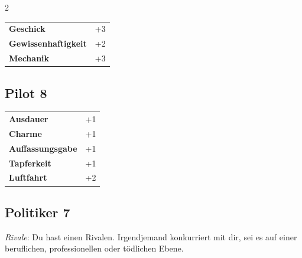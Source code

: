\begin{multicols}{2}
\begin{tcolorbox}
\begin{tabular}{@{}ll@{}}
    \textbf{Geschick} & +3\\
    \textbf{Gewissenhaftigkeit} & +2\\
    \textbf{Mechanik} & +3\\
\end{tabular}


\end{tcolorbox}

\begin{tcolorbox}
    \subsection*{Pilot \hfill \small{8 }}
    \tcblower




\begin{tabular}{@{}ll@{}}
    \textbf{Ausdauer} & +1\\
    \textbf{Charme} & +1\\
    \textbf{Auffassungsgabe} & +1\\
    \textbf{Tapferkeit} & +1\\
    \textbf{Luftfahrt} & +2\\
\end{tabular}


\end{tcolorbox}

\begin{tcolorbox}
    \subsection*{Politiker \hfill \small{7 }}
    \tcblower
\textit{Rivale}: Du hast einen Rivalen. Irgendjemand konkurriert mit dir, sei es auf einer beruflichen, professionellen oder tödlichen Ebene.


\end{tcolorbox}
\end{multicols}
